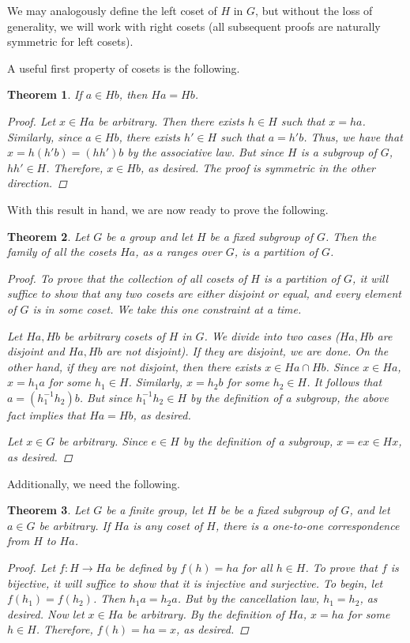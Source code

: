 \documentclass[openany, amssymb, psamsfonts]{amsart}
\newtheorem{thm}{Theorem}[section]
\theoremstyle{definition}
\numberwithin{equation}{section}
\begin{document}
We may analogously define the left coset of $H$ in $G$, but without the loss of generality, we will work with right cosets (all subsequent proofs are naturally symmetric for left cosets).\par
A useful first property of cosets is the following.
\begin{thm}
    If $a\in Hb$, then $Ha=Hb$.
    \begin{proof}
        Let $x\in Ha$ be arbitrary. Then there exists $h\in H$ such that $x=ha$. Similarly, since $a\in Hb$, there exists $h'\in H$ such that $a=h'b$. Thus, we have that $x=h(h'b)=(hh')b$ by the associative law. But since $H$ is a subgroup of $G$, $hh'\in H$. Therefore, $x\in Hb$, as desired. The proof is symmetric in the other direction.
    \end{proof}
\end{thm}
With this result in hand, we are now ready to prove the following.
\begin{thm}
    Let $G$ be a group and let $H$ be a fixed subgroup of $G$. Then the family of all the cosets $Ha$, as $a$ ranges over $G$, is a partition of $G$.
    \begin{proof}
        To prove that the collection of all cosets of $H$ is a partition of $G$, it will suffice to show that any two cosets are either disjoint or equal, and every element of $G$ is in some coset. We take this one constraint at a time.\par
        Let $Ha,Hb$ be arbitrary cosets of $H$ in $G$. We divide into two cases ($Ha,Hb$ are disjoint and $Ha,Hb$ are not disjoint). If they are disjoint, we are done. On the other hand, if they are not disjoint, then there exists $x\in Ha\cap Hb$. Since $x\in Ha$, $x=h_1a$ for some $h_1\in H$. Similarly, $x=h_2b$ for some $h_2\in H$. It follows that $a=(h_1^{-1}h_2)b$. But since $h_1^{-1}h_2\in H$ by the definition of a subgroup, the above fact implies that $Ha=Hb$, as desired.\par
        Let $x\in G$ be arbitrary. Since $e\in H$ by the definition of a subgroup, $x=ex\in Hx$, as desired.
    \end{proof}
\end{thm}
Additionally, we need the following.
\begin{thm}
    Let $G$ be a finite group, let $H$ be be a fixed subgroup of $G$, and let $a\in G$ be arbitrary. If $Ha$ is any coset of $H$, there is a one-to-one correspondence from $H$ to $Ha$.
    \begin{proof}
        Let $f:H\to Ha$ be defined by $f(h)=ha$ for all $h\in H$. To prove that $f$ is bijective, it will suffice to show that it is injective and surjective. To begin, let $f(h_1)=f(h_2)$. Then $h_1a=h_2a$. But by the cancellation law, $h_1=h_2$, as desired. Now let $x\in Ha$ be arbitrary. By the definition of $Ha$, $x=ha$ for some $h\in H$. Therefore, $f(h)=ha=x$, as desired.
    \end{proof}
\end{thm}
\end{document}
